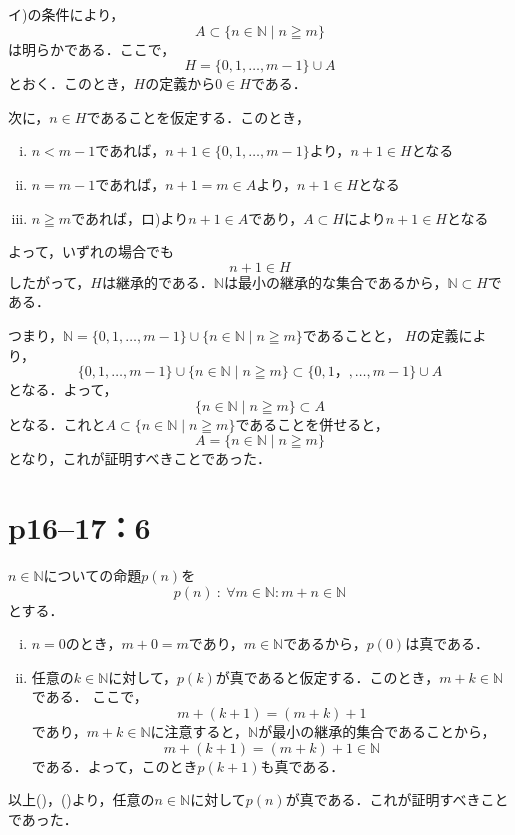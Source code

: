 \begin{tproof}
    イ)の条件により，
    \[
        A \subset \{n \in \mathbb{N} \mid n \geqq m\}
    \]
    は明らかである．ここで，
    \[
        H=\{0,1,\dots,m-1\} \cup A
    \]
    とおく．このとき，$H$の定義から$0 \in H$である．

    次に，$n \in H$であることを仮定する．このとき，
    \begin{enumerate}[(i)]
        \item  $n<m-1$であれば，$n+1 \in \{0,1,\dots,m-1\}$より，$n+1 \in H$となる
        \item $n=m-1$であれば，$n+1=m \in A$より，$n+1 \in H$となる
        \item $n \geqq m$であれば，ロ)より$n+1 \in A$であり，$A \subset H $により$n + 1\in H$となる
    \end{enumerate}
    よって，いずれの場合でも
    \[
        n+1 \in H
    \]
    したがって，$H$は継承的である．$\mathbb{N}$は最小の継承的な集合であるから，$\mathbb{N} \subset H$である．

    つまり，$\mathbb{N} =  \{0,1,\dots,m-1\} \cup \{n \in \mathbb{N} \mid n \geqq m \}$であることと，
    $H$の定義により，
    \[
        \{0,1,\dots,m-1\} \cup \{n \in \mathbb{N} \mid n \geqq m \} \subset \{0,1，,\dots,m-1\} \cup A
    \]
    となる．よって，
    \[
        \{n \in \mathbb{N}\mid n \geqq m \} \subset A
    \]
    となる．これと$ A \subset \{n \in \mathbb{N} \mid n \geqq m\}$であることを併せると，
    \[
        A=\{n \in \mathbb{N} \mid n \geqq m \}
    \]
    となり，これが証明すべきことであった．
\end{tproof}



\section*{p16--17：6}


\begin{tproof}
    $n \in \mathbb{N}$についての命題$p(n)$を
    \[
        p(n) ~{:}~ \forall m \in \mathbb{N} \colon  m+n \in \mathbb{N}
    \]
    とする．
    \begin{enumerate}[(i)]
        \item $n=0$のとき，$m+0=m$であり，$m \in \mathbb{N}$であるから，$p(0)$は真である．
        \item 任意の$k \in \mathbb{N}$に対して，$p(k)$が真であると仮定する．このとき，$m+k \in \mathbb{N}$である．
              ここで，
              \[
                  m+(k+1)=(m+k)+1
              \] であり，$m+k \in \mathbb{N}$に注意すると，$\mathbb{N}$が最小の継承的集合であることから，
              \[
                  m+(k+1)=(m+k)+1  \in \mathbb{N}
              \]
              である．よって，このとき$p(k+1)$も真である．
    \end{enumerate}
    以上()，()より，任意の$n \in \mathbb{N}$に対して$p(n)$が真である．これが証明すべきことであった．
\end{tproof}


